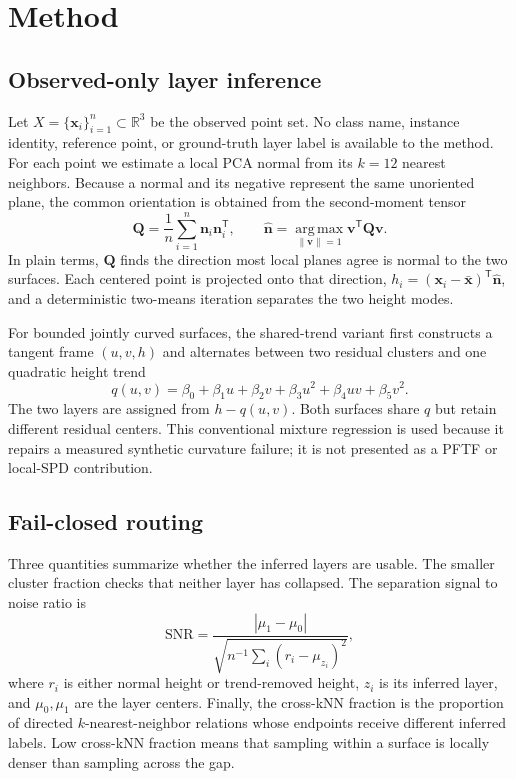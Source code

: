 \documentclass[12pt,a4paper]{article}
\begin{document}
\section{Method}

\subsection{Observed-only layer inference}

Let $X=\{\mathbf{x}_i\}_{i=1}^{n}\subset\mathbb{R}^3$ be the observed point set.
No class name, instance identity, reference point, or ground-truth layer label is
available to the method. For each point we estimate a local PCA normal from its
$k=12$ nearest neighbors. Because a normal and its negative represent the same
unoriented plane, the common orientation is obtained from the second-moment
tensor
\begin{equation}
 \mathbf{Q}=\frac{1}{n}\sum_{i=1}^{n}\mathbf{n}_i\mathbf{n}_i^{\mathsf T},
 \qquad
 \widehat{\mathbf{n}}=\operatorname*{arg\,max}_{\|\mathbf{v}\|=1}
 \mathbf{v}^{\mathsf T}\mathbf{Q}\mathbf{v}.
 \label{eq:normal}
\end{equation}
In plain terms, $\mathbf{Q}$ finds the direction most local planes agree is
normal to the two surfaces. Each centered point is projected onto that direction,
$h_i=(\mathbf{x}_i-\bar{\mathbf{x}})^{\mathsf T}\widehat{\mathbf{n}}$, and a
deterministic two-means iteration separates the two height modes.

For bounded jointly curved surfaces, the shared-trend variant first constructs a
tangent frame $(u,v,h)$ and alternates between two residual clusters and one
quadratic height trend
\begin{equation}
 q(u,v)=\beta_0+\beta_1u+\beta_2v+\beta_3u^2+
          \beta_4uv+\beta_5v^2.
 \label{eq:trend}
\end{equation}
The two layers are assigned from $h-q(u,v)$. Both surfaces share $q$ but retain
different residual centers. This conventional mixture regression is used because
it repairs a measured synthetic curvature failure; it is not presented as a PFTF
or local-SPD contribution.

\subsection{Fail-closed routing}

Three quantities summarize whether the inferred layers are usable. The smaller
cluster fraction checks that neither layer has collapsed. The separation signal
to noise ratio is
\begin{equation}
 \mathrm{SNR}=\frac{|\mu_1-\mu_0|}
 {\sqrt{n^{-1}\sum_i(r_i-\mu_{z_i})^2}},
 \label{eq:snr}
\end{equation}
where $r_i$ is either normal height or trend-removed height, $z_i$ is its inferred
layer, and $\mu_0,\mu_1$ are the layer centers. Finally, the cross-kNN fraction is
the proportion of directed $k$-nearest-neighbor relations whose endpoints receive
different inferred labels. Low cross-kNN fraction means that sampling within a
surface is locally denser than sampling across the gap.
\end{document}
